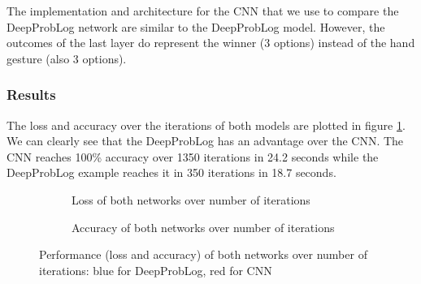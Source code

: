     The implementation and architecture for the CNN that we use to compare the DeepProbLog network are similar to the DeepProbLog model. However, the outcomes of the last layer do represent the winner (3 options) instead of the hand gesture (also 3 options).


\subsubsection{Results}
The loss and accuracy over the iterations of both models are plotted in figure \ref{fig:rps_output}. We can clearly see that the DeepProbLog has an advantage over the CNN. The CNN reaches 100\% accuracy over 1350 iterations in 24.2 seconds while the DeepProbLog example reaches it in 350 iterations in 18.7 seconds. 


\begin{figure}[h]
    \centering
    \begin{subfigure}[b]{0.49\textwidth}
        \caption{Loss of both networks over number of iterations}
    \end{subfigure}
    \hfill
    \begin{subfigure}[b]{0.49\textwidth}
        \caption{Accuracy of both networks over number of iterations}
    \end{subfigure}
    \caption{Performance (loss and accuracy) of both networks over number of iterations: blue for DeepProbLog, red for CNN}
    \label{fig:rps_output}
\end{figure}  

